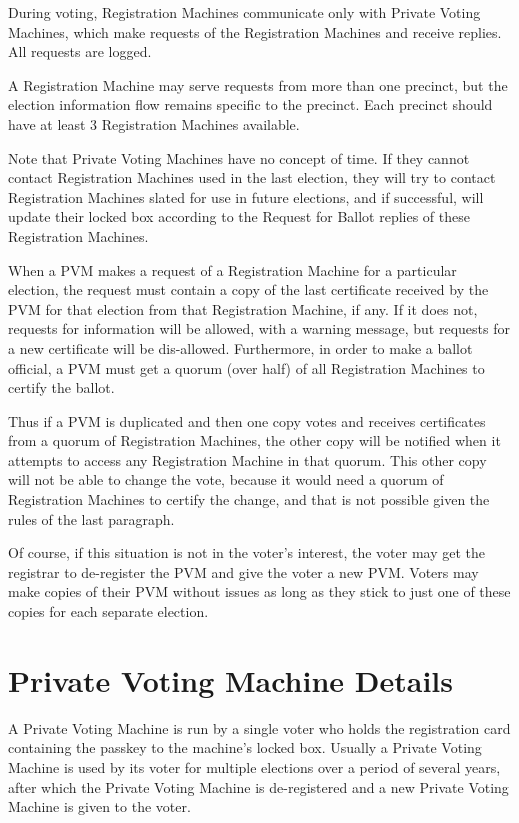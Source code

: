 \documentclass[12pt]{article}
\begin{document}
During voting, Registration Machines communicate only with
Private Voting Machines, which make requests of the Registration
Machines and receive replies.  All requests are logged.

A Registration Machine may serve requests from more than
one precinct, but the election information flow remains specific
to the precinct.  Each precinct should have at least 3
Registration Machines available.

Note that Private Voting Machines have no concept of time.
If they cannot contact Registration Machines used in the last
election, they will try to contact Registration Machines
slated for use in future elections, and if successful, will
update their locked box according to the Request for Ballot
replies of these Registration Machines.

When a PVM makes a request of a Registration Machine for
a particular election, the request must contain a copy of
the last certificate received by the PVM for that election
from that Registration Machine, if any.  If it does not,
requests for information will be allowed, with a warning
message, but requests for a new certificate will be dis-allowed.
Furthermore, in order to make a ballot official, a PVM must
get a quorum (over half) of all Registration Machines to certify
the ballot.

Thus if a PVM is duplicated and then one copy votes and receives certificates
from a quorum of Registration Machines,
the other copy will be notified when it attempts to access any
Registration Machine in that quorum.
This other copy will not be able to change the vote, because
it would need a quorum of Registration Machines to certify the
change, and that is not possible given the rules of the last paragraph.

Of course,
if this situation is not in the voter's interest, the voter
may get the registrar to de-register the PVM and give the voter
a new PVM.  Voters may make copies of their PVM without issues
as long as they stick to just one of these copies for each
separate election.

\section{Private Voting Machine Details}

A Private Voting Machine is run by a single voter
who holds the registration card containing the passkey to
the machine's locked box.  Usually a Private Voting Machine
is used by its voter for multiple elections over a period
of several years, after which the Private Voting Machine
is de-registered and a new Private Voting Machine
is given to the voter.
\end{document}
